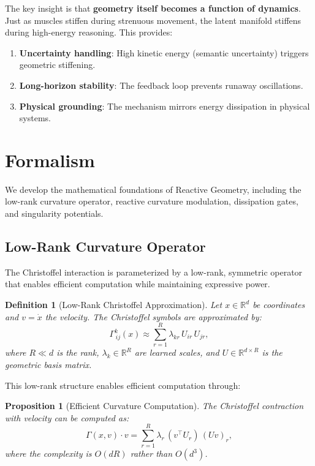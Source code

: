 \documentclass[12pt,letterpaper,twoside]{article}
\newtheorem{definition}{Definition}[section]
\newtheorem{prop}{Proposition}[section]
\begin{document}
The key insight is that \textbf{geometry itself becomes a function of dynamics}. Just as muscles stiffen during strenuous movement, the latent manifold stiffens during high-energy reasoning. This provides:

\begin{enumerate}
\item \textbf{Uncertainty handling}: High kinetic energy (semantic uncertainty) triggers geometric stiffening.
\item \textbf{Long-horizon stability}: The feedback loop prevents runaway oscillations.
\item \textbf{Physical grounding}: The mechanism mirrors energy dissipation in physical systems.
\end{enumerate}

\section{Formalism}

We develop the mathematical foundations of Reactive Geometry, including the low-rank curvature operator, reactive curvature modulation, dissipation gates, and singularity potentials.

\subsection{Low-Rank Curvature Operator}

The Christoffel interaction is parameterized by a low-rank, symmetric operator that enables efficient computation while maintaining expressive power.

\begin{definition}[Low-Rank Christoffel Approximation]
Let $x \in \mathbb{R}^d$ be coordinates and $v = \dot{x}$ the velocity. The Christoffel symbols are approximated by:
\[
\Gamma^k_{\!\,ij}(x) \approx \sum_{r=1}^{R} \lambda_{kr} \, U_{ir} \, U_{jr},
\]
where $R \ll d$ is the rank, $\lambda_k \in \mathbb{R}^R$ are learned scales, and $U \in \mathbb{R}^{d \times R}$ is the geometric basis matrix.
\end{definition}

This low-rank structure enables efficient computation through:

\begin{prop}[Efficient Curvature Computation]
The Christoffel contraction with velocity can be computed as:
\[
\Gamma(x,v) \cdot v = \sum_{r=1}^{R} \lambda_r \, (v^\top U_r) \, (U v)_r,
\]
where the complexity is $O(dR)$ rather than $O(d^3)$.
\end{prop}
\end{document}
